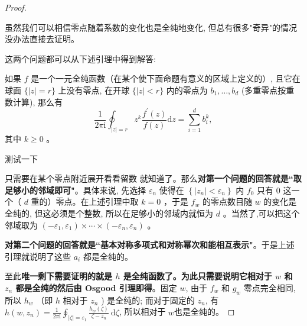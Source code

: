 \documentclass[lang=cn,12pt,fontset=none,a4paper]{beautybook}
\begin{document}
\begin{proof}
   \begin{remark}
      虽然我们可以相信零点随着系数的变化也是全纯地变化, 但总有很多"奇异"的情况没办法直接去证明。
   \end{remark}
   
   这两个问题都可以从下述引理中得到解答:
   
   \begin{lemma}
      如果 $f$ 是一个一元全纯函数（在某个使下面命题有意义的区域上定义的）, 且它在球面 $\{|z|=r\}$ 上没有零点, 在开球 $\{|z|<r\}$ 内的零点为 $b_1, \ldots, b_d$ (多重零点按重数计算), 那么有
      $$\frac{1}{2 \pi \mathrm{i}} \oint_{|z|=r} z^k \frac{f^{\prime}(z)}{f(z)} \mathrm{d} z=\sum_{i=1}^d b_i^k,$$
      其中 $k \geq 0$ 。
   \end{lemma}
   \begin{proposition*}
   测试一下
   \end{proposition*}
   
   只需要在某个零点附近展开看看留数 就知道了。那么\textbf{对第一个问题的回答就是``取足够小的邻域即可"}。具体来说, 先选择 $\varepsilon_n$ 使得在 $\left\{\left|z_n\right|<\varepsilon_n\right\}$ 内 $f_0$ 只有 0 这一个（ $d$ 重的）零点。在上述引理中取 $k=0$ ，于是 $f_w$ 的零点数目随 $w$ 的变化是全纯的, 但这必须是个整数, 所以在足够小的邻域内就恒为 $d$ 。当然了,可以把这个邻域取为 $\left(-\varepsilon_1, \varepsilon_1\right) \times \cdots \times\left(-\varepsilon_n, \varepsilon_n\right)$ 。
   
   \textbf{对第二个问题的回答就是``基本对称多项式和对称幂次和能相互表示"}。于是上述引理就说明了这些 $a_i$ 都是全纯的。
   
   
   至此\textbf{唯一剩下需要证明的就是 $h$ 是全纯函数了。为此只需要说明它相对于 $w$ 和 $z_n$ 都是全纯的然后由 Osgood 引理即得}。固定 $w$, 由于 $f_w$ 和 $g_w$ 零点完全相同, 所以 $h_w$ （即 $h$ 相对于 $z_n$ ) 是全纯的; 而对于固定的 $z_n$, 有 $h\left(w, z_n\right)=\frac{1}{2 \pi \mathrm{i}} \oint_{|\zeta|=\varepsilon_1} \frac{h_w(\zeta)}{\zeta-z_n} \mathrm{~d} \zeta$, 所以相对于 $w$也是全纯的。
   
\end{proof}
\end{document}
